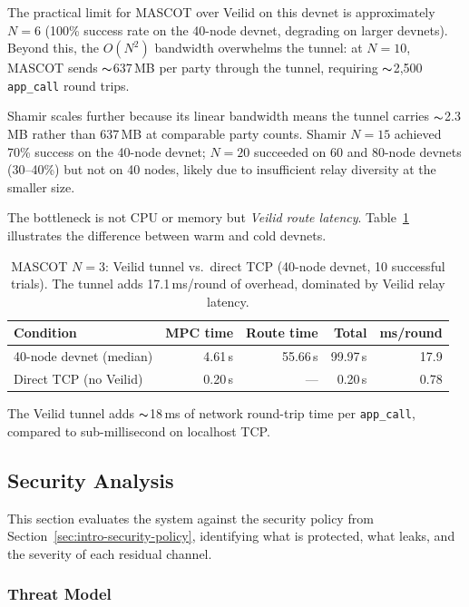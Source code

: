The practical limit for MASCOT over Veilid on this devnet is approximately
$N{=}6$ (100\% success rate on the 40-node devnet, degrading on larger
devnets).  Beyond this, the $O(N^2)$ bandwidth overwhelms the tunnel: at
$N{=}10$, MASCOT sends ${\thicksim}$637\,MB per party through the tunnel,
requiring ${\thicksim}$2,500 \texttt{app\_call} round trips.

Shamir scales further because its linear bandwidth means the tunnel carries
${\thicksim}$2.3\,MB rather than 637\,MB at comparable party counts.  Shamir
$N{=}15$ achieved 70\% success on the 40-node devnet; $N{=}20$ succeeded on
60 and 80-node devnets (30--40\%) but not on 40 nodes, likely due to
insufficient relay diversity at the smaller size.

The bottleneck is not CPU or memory but \emph{Veilid route latency}.
Table~\ref{tab:warm-cold} illustrates the difference between warm and cold
devnets.

\begin{table}[H]
\centering
\small
\begin{tabular}{lrrrr}
\toprule
\textbf{Condition} & \textbf{MPC time} & \textbf{Route time} &
  \textbf{Total} & \textbf{ms/round} \\
\midrule
40-node devnet (median) & 4.61\,s  & 55.66\,s & 99.97\,s & 17.9 \\
Direct TCP (no Veilid)  & 0.20\,s  & ---      & 0.20\,s  & 0.78 \\
\bottomrule
\end{tabular}
\caption{MASCOT $N{=}3$: Veilid tunnel vs.\ direct TCP (40-node devnet,
  10 successful trials).  The tunnel adds 17.1\,ms/round of overhead,
  dominated by Veilid relay latency.}
\label{tab:warm-cold}
\end{table}

The Veilid tunnel adds ${\thicksim}$18\,ms of network round-trip time per
\texttt{app\_call}, compared to sub-millisecond on localhost TCP.

\subsection{Security Analysis}
\label{sec:results-security}

This section evaluates the system against the security policy from
Section~\ref{sec:intro-security-policy}, identifying what is protected,
what leaks, and the severity of each residual channel.

\subsubsection{Threat Model}

